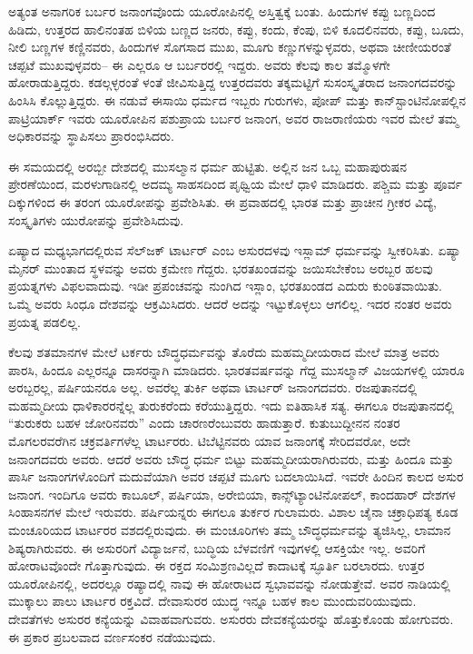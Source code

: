\vskip 3pt

ಅತ್ಯಂತ ಅನಾಗರಿಕ ಬರ್ಬರ ಜನಾಂಗವೊಂದು ಯೂರೋಪಿನಲ್ಲಿ ಅಸ್ತಿತ್ವಕ್ಕೆ ಬಂತು. ಹಿಂದುಗಳ ಕಪ್ಪು ಬಣ್ಣದಿಂದ ಹಿಡಿದು, ಉತ್ತರದ ಹಾಲಿನಂತಹ ಬಿಳಿಯ ಬಣ್ಣದ ಜನರು, ಕಪ್ಪು, ಕಂದು, ಕೆಂಪು, ಬಿಳಿ ಕೂದಲಿನವರು, ಕಪ್ಪು, ಬೂದು, ನೀಲಿ ಬಣ್ಣಗಳ ಕಣ್ಣಿನವರು, ಹಿಂದುಗಳ ಸೊಗಸಾದ ಮುಖ, ಮೂಗು ಕಣ್ಣುಗಳನ್ನುಳ್ಳವರು, ಅಥವಾ ಚೀಣೀಯರಂತೆ ಚಪ್ಪಟೆ ಮುಖವುಳ್ಳವರು– ಈ ಎಲ್ಲರೂ ಆ ಬರ್ಬರರಲ್ಲಿ ಇದ್ದರು. ಅವರು ಕೆಲವು ಕಾಲ ತಮ್ಮೊಳಗೇ ಹೋರಾಡುತ್ತಿದ್ದರು. ಕಡಲ್ಗಳ್ಳರಂತೆ ಳಂತೆ ಜೀವಿಸುತ್ತಿದ್ದ ಉತ್ತರದವರು ತಕ್ಕಮಟ್ಟಿಗೆ ಸುಸಂಸ್ಕೃತರಾದ ಜನಾಂಗದವರನ್ನು ಹಿಂಸಿಸಿ ಕೊಲ್ಲುತ್ತಿದ್ದರು. ಈ ನಡುವೆ ಈಸಾಯಿ ಧರ್ಮದ ಇಬ್ಬರು ಗುರುಗಳು, ಪೋಪ್​ ಮತ್ತು ಕಾನ್​ಸ್ಟಾಂಟಿನೋಪಲ್ಲಿನ ಪಾಟ್ರಿಯಾರ್ಕ್​ ಇವರು ಯೂರೋಪಿನ ಪಶುಪ್ರಾಯ ಬರ್ಬರ ಜನಾಂಗ, ಅವರ ರಾಜರಾಣಿಯರು ಇವರ ಮೇಲೆ ತಮ್ಮ ಅಧಿಕಾರವನ್ನು ಸ್ಥಾಪಿಸಲು ಪ್ರಾರಂಭಿಸಿದರು.

\vskip 3pt

ಈ ಸಮಯದಲ್ಲಿ ಅರಬ್ಬೀ ದೇಶದಲ್ಲಿ ಮುಸಲ್ಮಾನ ಧರ್ಮ ಹುಟ್ಟಿತು. ಅಲ್ಲಿನ ಜನ ಒಬ್ಬ ಮಹಾಪುರುಷನ ಪ್ರೇರಣೆಯಿಂದ, ಮರಳುಗಾಡಿನಲ್ಲಿ ಅದಮ್ಯ ಸಾಹಸದಿಂದ ಪೃಥ್ವಿಯ ಮೇಲೆ ಧಾಳಿ ಮಾಡಿದರು. ಪಶ್ಚಿಮ ಮತ್ತು ಪೂರ್ವ ದಿಕ್ಕುಗಳಿಂದ ಈ ತರಂಗ ಯೂರೋಪನ್ನು ಪ್ರವೇಶಿಸಿತು. ಈ ಪ್ರವಾಹದಲ್ಲಿ ಭಾರತ ಮತ್ತು ಪ್ರಾಚೀನ ಗ್ರೀಕರ ವಿದ್ಯೆ, ಸಂಸ್ಕೃತಿಗಳು ಯುರೋಪನ್ನು ಪ್ರವೇಶಿಸಿದುವು.

\vskip 3pt

ಏಷ್ಯಾದ ಮಧ್ಯಭಾಗದಲ್ಲಿರುವ ಸೆಲ್​ಜಕ್​ ಟಾರ್ಟರ್​ ಎಂಬ ಅಸುರದಳವು ಇಸ್ಲಾಮ್​ ಧರ್ಮವನ್ನು ಸ್ವೀಕರಿಸಿತು. ಏಷ್ಯಾ ಮೈನರ್​ ಮುಂತಾದ ಸ್ಥಳವನ್ನು ಅವರು ಕ್ರಮೇಣ ಗೆದ್ದರು. ಭರತಖಂಡವನ್ನು ಜಯಿಸಬೇಕೆಂಬ ಅರಬ್ಬರ ಹಲವು ಪ್ರಯತ್ನಗಳು ವಿಫಲ\break ವಾದುವು. ಇಡೀ ಪ್ರಪಂಚವನ್ನು ನುಂಗಿದ ಇಸ್ಲಾಂ, ಭರತಖಂಡದ ಎದುರು ಕುಂಠಿತವಾಯಿತು. ಒಮ್ಮೆ ಅವರು ಸಿಂಧೂ ದೇಶವನ್ನು ಆಕ್ರಮಿಸಿದರು. ಆದರೆ ಅದನ್ನು ಇಟ್ಟುಕೊಳ್ಳಲು ಆಗಲಿಲ್ಲ. ಇದರ ನಂತರ ಅವರು ಪ್ರಯತ್ನ ಪಡಲಿಲ್ಲ.

\vskip 3pt

ಕೆಲವು ಶತಮಾನಗಳ ಮೇಲೆ ಟರ್ಕರು ಬೌದ್ಧಧರ್ಮವನ್ನು ತೊರೆದು ಮಹಮ್ಮದೀಯ\break ರಾದ ಮೇಲೆ ಮಾತ್ರ ಅವರು ಪಾರಸಿ, ಹಿಂದೂ ಎಲ್ಲರನ್ನೂ ದಾಸರನ್ನಾಗಿ ಮಾಡಿದರು. ಭಾರತವರ್ಷವನ್ನು ಗೆದ್ದ ಮುಸಲ್ಮಾನ್​ ವಿಜಯಗಳಲ್ಲಿ ಯಾರೂ ಅರಬ್ಬರಲ್ಲ, ಪರ್ಷಿಯನರೂ ಅಲ್ಲ. ಅವರೆಲ್ಲ ತುರ್ಕಿ ಅಥವಾ ಟಾರ್ಟರ್​ ಜನಾಂಗದವರು. ರಜಪುತಾನ\break ದಲ್ಲಿ ಮಹಮ್ಮದೀಯ ಧಾಳಿಕಾರರನ್ನೆಲ್ಲ ತುರುಕರೆಂದು ಕರೆಯುತ್ತಿದ್ದರು. ಇದು ಐತಿಹಾಸಿಕ ಸತ್ಯ. ಈಗಲೂ ರಜಪುತಾನದಲ್ಲಿ “ತುರುಕರು ಬಹಳ ಜೋರಿನವರು” ಎಂದು ಚಾರಣರೆಂಬುವರು ಹಾಡುತ್ತಾರೆ. ಕುತುಬುದ್ದೀನನ ನಂತರ ಮೊಗಲರವರೆಗಿನ ಚಕ್ರವರ್ತಿ\break ಗಳೆಲ್ಲ ಟಾರ್ಟರರು. ಟಿಬೆಟ್ಟಿನವರು ಯಾವ ಜನಾಂಗಕ್ಕೆ ಸೇರಿದವರೋ, ಅದೇ ಜನಾಂಗದವರು ಅವರು. ಆದರೆ ಅವರು ಬೌದ್ಧ ಧರ್ಮ ಬಿಟ್ಟು ಮಹಮ್ಮದೀಯರಾಗಿರುವರು, ಮತ್ತು ಹಿಂದೂ ಮತ್ತು ಪಾರ್ಸಿ ಜನಾಂಗಗಳೊಂದಿಗೆ ಮದುವೆಯಾಗಿ ಅವರ ಚಪ್ಪಟೆ ಮೂಗು ಬದಲಾಯಿಸಿದೆ. ಇವರೇ ಹಿಂದಿನ ಕಾಲದ ಅಸುರ ಜನಾಂಗ. ಇಂದಿಗೂ ಅವರು ಕಾಬೂಲ್​, ಪರ್ಷಿಯಾ, ಅರೇಬಿಯಾ, ಕಾನ್ಸ್​ಟ್ಯಾಂಟಿನೋಪಲ್​, ಕಾಂದಹಾರ್​ ದೇಶಗಳ ಸಿಂಹಾಸನಗಳ ಮೇಲೆ ಇರುವರು. ಪರ್ಷಿಯನ್ನರು ಈಗಲೂ ತುರ್ಕರ ಗುಲಾಮರು. ವಿಶಾಲ ಚೈನಾ ಚಕ್ರಾಧಿಪತ್ಯ ಕೂಡ ಮಂಚೂರಿಯದ ಟಾರ್ಟರರ ವಶದಲ್ಲಿರುವುದು. ಈ ಮಂಚೂರಿಗಳು ತಮ್ಮ ಬೌದ್ಧಧರ್ಮವನ್ನು ತ್ಯಜಿಸಿಲ್ಲ, ಲಾಮಾನ ಶಿಷ್ಯರಾಗಿರುವರು. ಈ ಅಸುರರಿಗೆ ವಿದ್ಯಾರ್ಜನೆ, ಬುದ್ಧಿಯ ಬೆಳವಣಿಗೆ ಇವುಗಳಲ್ಲಿ ಆಸಕ್ತಿಯೇ ಇಲ್ಲ. ಅವರಿಗೆ ಹೋರಾಟವೊಂದೇ ಗೊತ್ತಾಗುವುದು. ಈ ರಕ್ತದ ಸಂಮಿಶ್ರಣವಿಲ್ಲದೆ ಕಾದಾಟಕ್ಕೆ ಸ್ಫೂರ್ತಿ ಬರಲಾರದು. ಉತ್ತರ ಯೂರೋಪಿನಲ್ಲಿ, ಅದರಲ್ಲೂ ರಷ್ಯಾದಲ್ಲಿ ನಾವು ಈ ಹೋರಾಟದ ಸ್ವಭಾವವನ್ನು ನೋಡುತ್ತೇವೆ. ಅವರ ನಾಡಿಯಲ್ಲಿ ಮುಕ್ಕಾಲು ಪಾಲು ಟಾರ್ಟರ ರಕ್ತವಿದೆ. ದೇವಾಸುರರ ಯುದ್ಧ ಇನ್ನೂ ಬಹಳ ಕಾಲ ಮುಂದುವರಿಯುವುದು. ದೇವತೆಗಳು ಅಸುರರ ಕನ್ಯೆಯನ್ನು ವಿವಾಹವಾಗುವರು. ಅಸುರರು ದೇವಕನ್ಯೆಯರನ್ನು ಹೊತ್ತುಕೊಂಡು ಹೋಗುವರು. ಈ ಪ್ರಕಾರ ಪ್ರಬಲವಾದ ವರ್ಣಸಂಕರ ನಡೆಯುವುದು.

